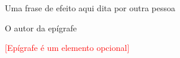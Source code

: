 \thispagestyle{empty}
\mbox{}\vfill
\epigraph{Uma frase de efeito aqui dita por outra pessoa}{O autor da epígrafe}
\textcolor{red}{[Epígrafe é um elemento opcional]}
